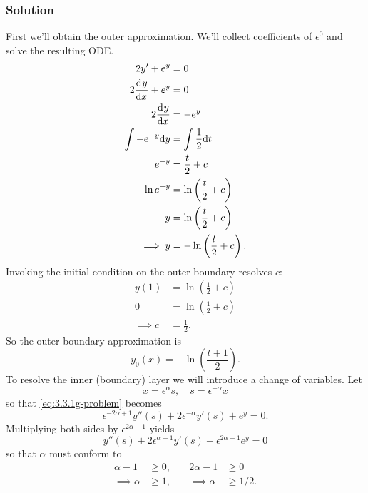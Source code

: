 \documentclass[12pt,twoside]{article}
\begin{document}
\subsubsection*{Solution}
First we'll obtain the outer approximation. We'll collect coefficients of
$\epsilon^0$ and solve the resulting ODE.\@
\begin{equation*}
  \begin{aligned}
    2y'+e^y&=0 \\
    2\frac{\mathrm{d}^{} {y}}{\mathrm{d}{x}^{}}+e^y&=0 \\
    2\frac{\mathrm{d}^{} {y}}{\mathrm{d}{x}^{}} &= -e^y \\
    \int -e^{-y} \mathrm{d}{y} &= \int\frac{1}{2} \mathrm{d}{t} \\
    e^{-y} &= \frac{t}{2}+c \\
    \ln e^{-y} &= \ln\left( \frac{t}{2}+c \right) \\
    -y &= \ln\left( \frac{t}{2}+c \right) \\
    \implies y &= -\ln\left( \frac{t}{2}+c \right).
  \end{aligned}
\end{equation*}
Invoking the initial condition on the outer boundary resolves $c$:
\begin{equation*}
  \begin{aligned}
    y(1) &= \ln\left( \frac{1}{2}+c \right) \\
    0 &= \ln\left( \frac{1}{2}+c \right) \\
    \implies c &= \frac{1}{2}.
  \end{aligned}
\end{equation*}
So the outer boundary approximation is
\begin{equation*}
  \boxed{y_0(x) = -\ln\left( \frac{t+1}{2} \right).}
\end{equation*}
To resolve the inner (boundary) layer we will introduce a change of variables.
Let
\begin{equation*}
  x=\epsilon^{\alpha}s,\quad s=\epsilon^{-\alpha}x
\end{equation*}
so that \cref{eq:3.3.1g-problem} becomes
\begin{equation*}
  \epsilon^{-2\alpha+1}y''(s) + 2\epsilon^{-\alpha}y'(s) + e^y = 0.
\end{equation*}
Multiplying both sides by $\epsilon^{2\alpha-1}$ yields
\begin{equation}
  \label{eq:3.3.1g-ys-alpha}
  y''(s) + 2\epsilon^{\alpha-1}y'(s) + \epsilon^{2\alpha-1}e^y=0
\end{equation}
so that $\alpha$ must conform to
\begin{equation}
  \label{eq:3.3.1g-alpha-conditions}
  \begin{aligned}
    \alpha-1&\ge0, &\quad 2\alpha-1&\ge0 \\
    \implies \alpha&\ge1, &\quad \implies \alpha&\ge1/2. \\
  \end{aligned}
\end{equation}
\end{document}
